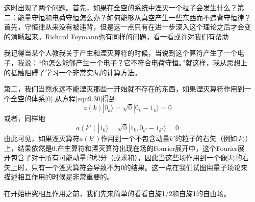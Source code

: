 这时出现了两个问题。首先，如果在全空的系统中湮灭一个粒子会发生什么？第二：能量守恒和电荷守恒怎么办？如何能够从真空产生一些东西而不违背守恒律？首先，守恒律从来没有被违背，但是这一点只有在进一步深入这个理论之后才会变的清晰起来。Richard Feymann也有同样的问题，看一看或许对我们有帮助\\
\begin{center}
\parbox{0.9\textwidth}{\small 我记得当某个人教我关于产生和湮灭算符的时候，当说到这个算符产生了一个电子，我说：“你怎么能够产生一个电子？它不符合电荷守恒。”就这样，我从思想上的抵触阻碍了学习一个非常实际的计算方法。}
\end{center}\vspace{4mm}
第二，我们当然永远不能湮灭那些一开始就不存在的东西，如果湮灭算符作用到一个全空的体系$|0\rangle$,从方程\eqref{equ9.30}得到
\begin{equation}
\label{equ9.31}
	a(k)|0_{k} \rangle=\sqrt{0}|0_{k}-1_{k} \rangle=0
\end{equation}
或者，同样地
\begin{equation}
\label{equ9.32}
	a(k')|1_{k} \rangle=\sqrt{0}|1_{k}, 0_{k'} - 1_{k'} \rangle=0
\end{equation}
由此可见，如果湮灭算符$a(k')$作用到一个不包含动量$k'$的粒子的右矢（例如$|k\rangle$）上，结果依然是$0$.产生算符和湮灭算符出现在场的Fourier展开中，这个Fourier展开包含了对于所有可能动量的积分（或求和），因此当这些场作用到一个像$|k\rangle$的右矢上时，只有一个湮灭算符会导致不为0的结果。这一点在我们试图用量子场论来描述相互作用的时候是非常重要的。

在开始研究相互作用之前，我们先来简单的看看自旋1/2和自旋1的自由场。

